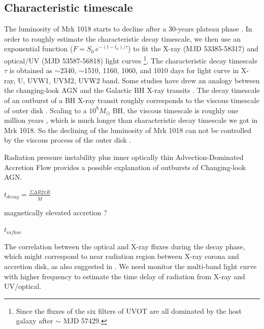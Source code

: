 \documentclass[twocolumn]{aastex63}
\begin{document}
\subsection{Characteristic timescale}
 The luminosity of Mrk 1018 starts to decline after a 30-years plateau phase \citep[see][]{2016A&A...593L...8M}. In order to roughly estimate the characteristic decay timescale, we then use an exponential function ($F=S_0\,e^{-(t-t_0)/\tau }$) to fit the X-ray (MJD 53385-58317) and optical/UV (MJD 53587-56818) light curves \footnote{Since the fluxes of the six filters of UVOT are all dominated by the host galaxy after $\sim$ MJD 57429. }. The characteristic decay timescale $\tau$ is obtained as $\sim$2340, $\sim$1510, 1160, 1060, and 1010 days for light curve in X-ray, U, UVW1, UVM2, UVW2 band. Some studies have drew an analogy between the changing-look AGN and the Galactic BH X-ray transits \citep[e.g. ][]{2018MNRAS.480.3898N,2019ApJ...883...76R}. The decay timescale of an outburst of a BH X-ray transit roughly corresponds to the viscous timescale of outer disk \citep[e.g. ][]{1998MNRAS.293L..42K}. Scaling to a $10^{8}M_{\odot}$ BH, the viscous timescale is roughly one million years \citep{2012MmSAI..83..469L,2018MNRAS.475.1190Y}, which is much longer than characteristic decay timescale we got in Mrk 1018. So the declining of the luminosity of Mrk 1018 can not be controlled by the viscous process of the outer disk \citep[see also ][]{2018MNRAS.480.3898N}. 
 
 
 
 Radiation pressure instability plus inner optically thin Advection-Dominated Accretion Flow \citep[see][]{2019arXiv190406767S} provides a possible explanation of outbursts of Changing-look AGN. 

$t_{decay}=\frac{\Sigma \Delta R 2\pi R}{\dot{M}}$

magnetically elevated accretion \citep[see][]{2019MNRAS.483L..17D} ?

$t_{inflow}$
 
 
 The correlation between the optical and X-ray fluxes during the decay phase, which might correspond to near radiation region  between X-ray corona and accretion disk, as also suggested in \citet{2017A&A...607L...9K}. We need monitor the multi-band light curve with higher frequency to estimate the time delay of radiation from X-ray and UV/optical.







\end{document}
